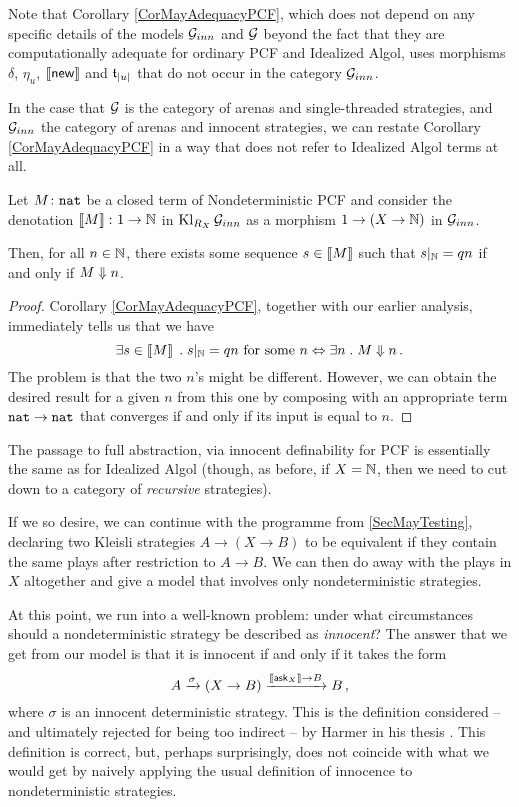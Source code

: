 Note that Corollary \ref{CorMayAdequacyPCF}, which does not depend on any specific details of the models $\mathcal G_{inn}$ and $\mathcal G$ beyond the fact that they are computationally adequate for ordinary PCF and Idealized Algol, uses morphisms $\delta$, $\eta_u$, $\left\llbracket\operatorname{{\mathsf{new}}}\right\rrbracket$ and $\mathfrak t_{|u|}$ that do not occur in the category $\mathcal G_{inn}$.

In the case that $\mathcal G$ is the category of arenas and single-threaded strategies, and $\mathcal G_{inn}$ the category of arenas and innocent strategies, we can restate Corollary \ref{CorMayAdequacyPCF} in a way that does not refer to Idealized Algol terms at all.

\begin{corollary}
  Let $M\colon{\mathtt{nat}}$ be a closed term of Nondeterministic PCF and consider the denotation $\left\llbracket M\right\rrbracket \colon 1 \to \mathbb{N}$ in $\operatorname{Kl}_{R_X}\mathcal G_{inn}$ as a morphism $1 \to (X \to \mathbb{N})$ in $\mathcal G_{inn}$.  

  Then, for all $n\in\mathbb{N}$, there exists some sequence $s\in\left\llbracket M\right\rrbracket$ such that $s\vert_{\mathbb{N}} = qn$ if and only if $M\Downarrow n$.
  \label{CorMayAdequacyPcfComb}
\end{corollary}
\begin{proof}
  Corollary \ref{CorMayAdequacyPCF}, together with our earlier analysis, immediately tells us that we have
  \[
    \exists s\in \left\llbracket M\right\rrbracket \;.\; s\vert_{\mathbb{N}} = qn\text{ for some $n$} \Leftrightarrow \exists n\;.\; M\Downarrow n\,.
    \]
  The problem is that the two $n$'s might be different.  
  However, we can obtain the desired result for a given $n$ from this one by composing with an appropriate term ${\mathtt{nat}} \to {\mathtt{nat}}$ that converges if and only if its input is equal to $n$.
\end{proof}

The passage to full abstraction, via innocent definability for PCF is essentially the same as for Idealized Algol (though, as before, if $X=\mathbb{N}$, then we need to cut down to a category of \emph{recursive} strategies).

If we so desire, we can continue with the programme from \sec\ref{SecMayTesting}, declaring two Kleisli strategies $A \to (X \to B)$ to be equivalent if they contain the same plays after restriction to $A \to B$.
We can then do away with the plays in $X$ altogether and give a model that involves only nondeterministic strategies.

At this point, we run into a well-known problem: under what circumstances should a nondeterministic strategy be described as \emph{innocent}? 
The answer that we get from our model is that it is innocent if and only if it takes the form
\[
  A \xrightarrow{\sigma} (X \to B) \xrightarrow{\left\llbracket\operatorname{{\mathsf{ask}}}_X\right\rrbracket \to B} B\,,
  \]
where $\sigma$ is an innocent deterministic strategy.  
This is the definition considered -- and ultimately rejected for being too indirect -- by Harmer in his thesis \cite[]{RusssThesis}.  
This definition is correct, but, perhaps surprisingly, does not coincide with what we would get by naively applying the usual definition of innocence to nondeterministic strategies.

